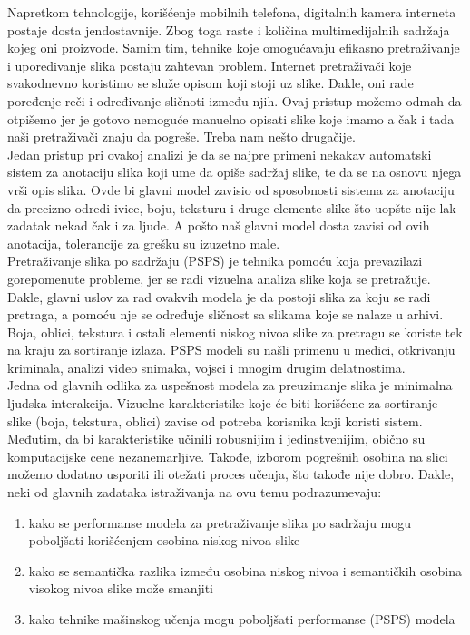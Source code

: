 \documentclass{article}
\begin{document}
Napretkom tehnologije, korišćenje mobilnih telefona, digitalnih kamera interneta postaje dosta jendostavnije. Zbog toga raste i količina multimedijalnih sadržaja kojeg oni proizvode. Samim tim, tehnike koje omogućavaju efikasno pretraživanje i upoređivanje slika postaju zahtevan problem. Internet pretraživači koje svakodnevno koristimo se služe opisom koji stoji uz slike. Dakle, oni rade poređenje reči i određivanje sličnoti između njih. Ovaj pristup možemo odmah da otpišemo jer je gotovo nemoguće manuelno opisati slike koje imamo a čak i tada naši pretraživači znaju da pogreše. Treba nam nešto drugačije. \\
Jedan pristup pri ovakoj analizi je da se najpre primeni nekakav automatski sistem za anotaciju slika koji ume da opiše sadržaj slike, te da se na osnovu njega vrši opis slika. Ovde bi glavni model zavisio od sposobnosti sistema za anotaciju da precizno odredi ivice, boju, teksturu i druge elemente slike što uopšte nije lak zadatak nekad čak i za ljude. A pošto naš glavni model dosta zavisi od ovih anotacija, tolerancije za grešku su izuzetno male.\\
Pretraživanje slika po sadržaju (PSPS) je tehnika pomoću koja prevazilazi gorepomenute probleme, jer se radi vizuelna analiza slike koja se pretražuje. Dakle, glavni uslov za rad ovakvih modela je da postoji slika za koju se radi pretraga, a pomoću nje se određuje sličnost sa slikama koje se nalaze u arhivi. Boja, oblici, tekstura i ostali elementi niskog nivoa slike za pretragu se koriste tek na kraju za sortiranje izlaza. PSPS modeli su našli primenu u medici, otkrivanju kriminala, analizi video snimaka, vojsci i mnogim drugim delatnostima. \\
Jedna od glavnih odlika za uspešnost modela za preuzimanje slika je minimalna ljudska interakcija. Vizuelne karakteristike koje će biti korišćene za sortiranje slike (boja, tekstura, oblici) zavise od potreba korisnika koji koristi sistem. Međutim, da bi karakteristike učinili robusnijim i jedinstvenijim, obično su komputacijske cene nezanemarljive. Takođe, izborom pogrešnih osobina na slici  možemo dodatno usporiti ili otežati proces učenja, što takođe nije dobro. Dakle, neki od glavnih zadataka istraživanja na ovu temu podrazumevaju: 
\begin{enumerate}
\item kako se performanse modela za pretraživanje slika po sadržaju mogu poboljšati korišćenjem osobina niskog nivoa slike 
\item kako se semantička razlika između osobina niskog nivoa i semantičkih osobina visokog nivoa slike može smanjiti
\item kako tehnike mašinskog učenja mogu poboljšati performanse (PSPS) modela
\end{enumerate}
\end{document}
